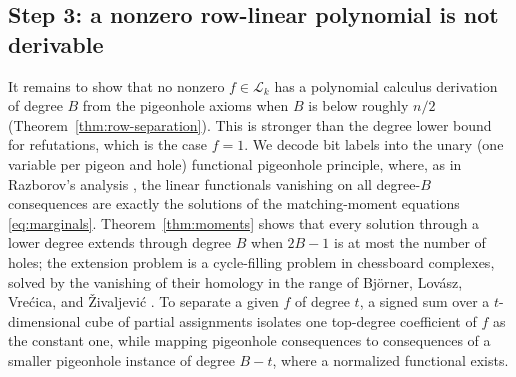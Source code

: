 \subsection{Step 3: a nonzero row-linear polynomial is not derivable}
It remains to show that no nonzero \(f\in\mathcal L_k\) has a polynomial
calculus derivation of degree \(B\) from the pigeonhole axioms when \(B\)
is below roughly \(n/2\) (Theorem~\ref{thm:row-separation}). This is
stronger than the degree lower bound for refutations, which is the case
\(f=1\). We decode bit labels into the unary (one variable per pigeon and
hole) functional pigeonhole principle, where, as in Razborov's analysis
\cite{Raz98}, the linear functionals vanishing on all degree-\(B\)
consequences are exactly the solutions of the matching-moment equations
\eqref{eq:marginals}. Theorem~\ref{thm:moments} shows that every solution
through a lower degree extends through degree \(B\) when \(2B-1\) is at
most the number of holes; the extension problem is a cycle-filling problem
in chessboard complexes, solved by the vanishing of their homology in the
range of Bj\"orner, Lov\'asz, Vre\'cica, and \v{Z}ivaljevi\'c
\cite{BLVZ94}. To separate a given \(f\) of degree \(t\), a signed sum over a
\(t\)-dimensional cube of partial assignments isolates one top-degree
coefficient of \(f\) as the constant one, while mapping pigeonhole
consequences to consequences of a smaller pigeonhole instance of degree
\(B-t\), where a normalized functional exists.

